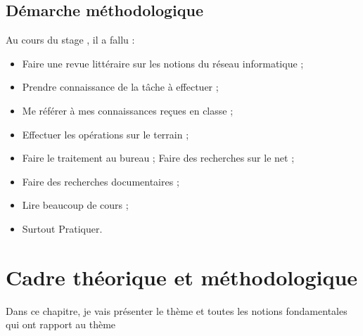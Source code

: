 \documentclass[a4paper,12pt,french]{report} %
\begin{document}
\section{Démarche méthodologique}
	Au cours du stage , il a fallu :
	\begin{itemize}
		\item Faire une revue littéraire sur les notions du réseau informatique ;
		\item  Prendre connaissance de la tâche à effectuer ;
		\item Me référer à mes connaissances reçues en classe ;
		\item Effectuer les opérations sur le terrain ;
		\item Faire le traitement au bureau ;
		Faire des recherches sur le net  ;
		\item Faire des recherches documentaires ;
		\item Lire beaucoup de cours ;
		\item Surtout Pratiquer.
	\end{itemize}
			
\chapter{Cadre théorique et méthodologique}
	Dans ce chapitre, je vais présenter le thème et toutes les notions fondamentales qui ont rapport au thème 
\end{document}
